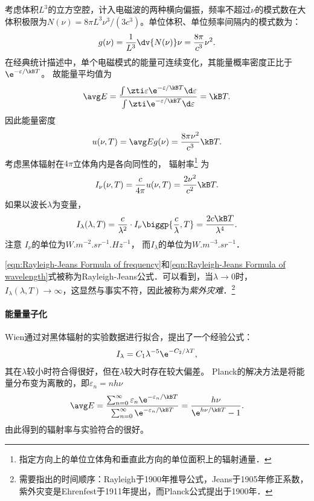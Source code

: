 考虑体积$L^3$的立方空腔，计入电磁波的两种横向偏振，频率不超过$\nu$的模式数在大体积极限为$N(\nu)=8\pi L^3\nu^3/(3c^3)$。单位体积、单位频率间隔内的模式数为：
\[
	g(\nu)=\frac1{L^3}\dv{N(\nu)}\nu=\frac{8\pi}{c^3}\nu^2.
\]
在经典统计描述中，单个电磁模式的能量可连续变化，其能量概率密度正比于$\e^{-\varepsilon/\kB T}$。
故能量平均值为
\begin{align}
	\avg E=\frac{\textstyle\int\zti\varepsilon\e^{-\varepsilon/\kB T}\d\varepsilon}{\textstyle\int\zti\e^{-\varepsilon/\kB T}\d\varepsilon}=\kB T.
\end{align}
因此能量密度
\[
u(\nu,T)=\avg Eg(\nu)=\frac{8\pi\nu^2}{c^3}\kB T.
\]
考虑黑体辐射在$4\pi$立体角内是各向同性的，
辐射率\footnote{指定方向上的单位立体角和垂直此方向的单位面积上的辐射通量．}
为
\begin{align}
	\label{eqn:Rayleigh-Jeans Formula of frequency}
	I_\nu(\nu,T)=\frac c{4\pi}u(\nu,T)=\frac{2\nu^2}{c^2}\kB T.
\end{align}
如果以波长$\lambda$为变量，%
\begin{align}
	\label{eqn:Rayleigh-Jeans Formula of wavelength}
	I_\lambda(\lambda,T)=\frac{c}{\lambda^2}\cdot I_\nu\biggp{\frac c\lambda,T}=\frac{2c\kB T}{\lambda^4}.
\end{align}
注意
$I_\nu$的单位为$\si{W.m^{-2}.sr^{-1}.Hz^{-1}}$，
而$I_\lambda$的单位为$\si{W.m^{-3}.sr^{-1}}$．

\eqref{eqn:Rayleigh-Jeans Formula of frequency}和\eqref{eqn:Rayleigh-Jeans Formula of wavelength}式被称为Rayleigh-Jeans公式．可以看到，当$\lambda\to0$时，$I_\lambda(\lambda,T)\to\infty$，这显然与事实不符，因此被称为\textit{紫外灾难}．\footnote{需要指出的时间顺序：Rayleigh于1900年推导公式，Jeans于1905年修正系数，紫外灾变是Ehrenfest于1911年提出，而Planck公式提出于1900年．}

\paragraph{能量量子化}

Wien通过对黑体辐射的实验数据进行拟合，提出了一个经验公式：
\begin{equation}
	I_\lambda=C_1\lambda^{-5}\e^{-C_2/\lambda T},
\end{equation}
其在$\lambda$较小时符合得很好，但在$\lambda$较大时存在较大偏差。
Planck的解决方法是将能量分布变为离散的，即$\varepsilon_n=nh\nu$
\begin{align}
	\avg E=\frac{\textstyle\sum_{n=0}^\infty \varepsilon_n\e^{-\varepsilon_n/\kB T}}{\textstyle\sum_{n=0}^\infty\e^{-\varepsilon_n/\kB T}}=\frac{h\nu}{\e^{h\nu/\kB T}-1}.
\end{align}
由此得到的辐射率与实验符合的很好。

